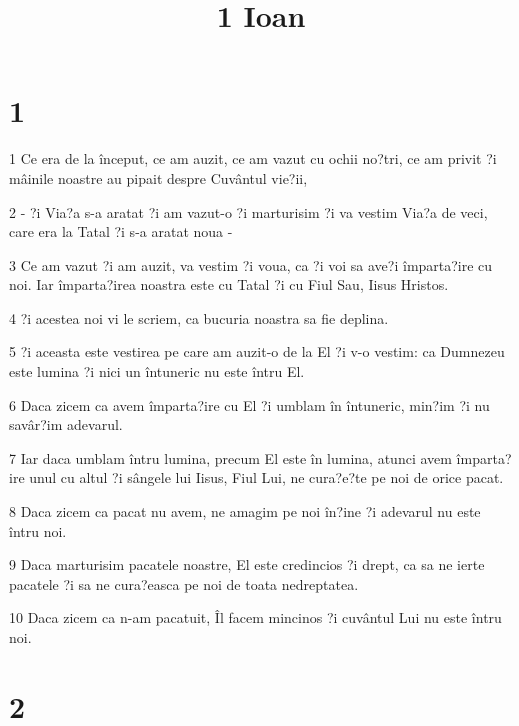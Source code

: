 

\title{1 Ioan}


\chapter{1}

\par 1 Ce era de la început, ce am auzit, ce am vazut cu ochii no?tri, ce am privit ?i mâinile noastre au pipait despre Cuvântul vie?ii,
\par 2 - ?i Via?a s-a aratat ?i am vazut-o ?i marturisim ?i va vestim Via?a de veci, care era la Tatal ?i s-a aratat noua -
\par 3 Ce am vazut ?i am auzit, va vestim ?i voua, ca ?i voi sa ave?i împarta?ire cu noi. Iar împarta?irea noastra este cu Tatal ?i cu Fiul Sau, Iisus Hristos.
\par 4 ?i acestea noi vi le scriem, ca bucuria noastra sa fie deplina.
\par 5 ?i aceasta este vestirea pe care am auzit-o de la El ?i v-o vestim: ca Dumnezeu este lumina ?i nici un întuneric nu este întru El.
\par 6 Daca zicem ca avem împarta?ire cu El ?i umblam în întuneric, min?im ?i nu savâr?im adevarul.
\par 7 Iar daca umblam întru lumina, precum El este în lumina, atunci avem împarta?ire unul cu altul ?i sângele lui Iisus, Fiul Lui, ne cura?e?te pe noi de orice pacat.
\par 8 Daca zicem ca pacat nu avem, ne amagim pe noi în?ine ?i adevarul nu este întru noi.
\par 9 Daca marturisim pacatele noastre, El este credincios ?i drept, ca sa ne ierte pacatele ?i sa ne cura?easca pe noi de toata nedreptatea.
\par 10 Daca zicem ca n-am pacatuit, Îl facem mincinos ?i cuvântul Lui nu este întru noi.

\chapter{2}

